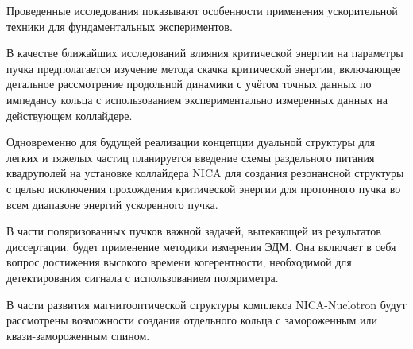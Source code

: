 \par Проведенные исследования показывают особенности применения ускорительной техники для фундаментальных экспериментов.

\par В качестве ближайших исследований влияния критической энергии на параметры пучка предполагается изучение метода скачка критической энергии, включающее детальное рассмотрение продольной динамики с учётом точных данных по импедансу кольца с использованием экспериментально измеренных данных на действующем коллайдере.

\par Одновременно для будущей реализации концепции дуальной структуры для легких и тяжелых частиц планируется введение схемы раздельного питания квадруполей на установке коллайдера NICA для создания резонансной структуры с целью исключения прохождения критической энергии для протонного пучка во всем диапазоне энергий ускоренного пучка. 

\par В части поляризованных пучков важной задачей, вытекающей из результатов диссертации, будет применение методики измерения ЭДМ. Она включает в себя вопрос достижения высокого времени когерентности, необходимой для детектирования сигнала с использованием поляриметра. 

\par В части развития магнитооптической структуры комплекса NICA-Nuclotron будут рассмотрены возможности создания отдельного кольца с замороженным или квази-замороженным спином. 





